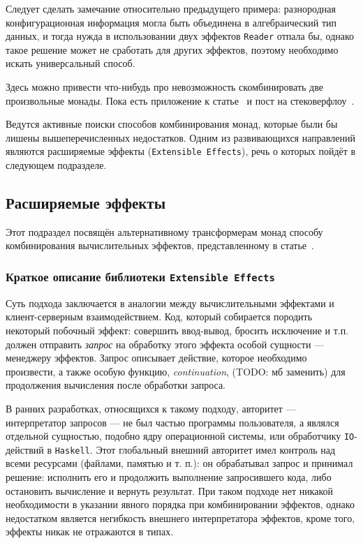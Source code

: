 Следует сделать замечание относительно предыдущего примера: разнородная конфигурационная информация могла быть объединена в алгебраический тип данных, и тогда нужда в использовании двух эффектов \lstinline{Reader} отпала бы, однако такое решение может не сработать для других эффектов, поэтому необходимо искать универсальный способ. 

Здесь можно привести что-нибудь про невозможность скомбинировать две произвольные монады. Пока есть приложение к статье~\autocite{ComposingMonads} и пост на стековерфлоу~\autocite{SOMonadsComposition}.

Ведутся активные поиски способов комбинирования монад, которые были бы лишены вышеперечисленных недостатков. Одним из развивающихся направлений являются расширяемые эффекты (\lstinline{Extensible Effects}), речь о которых пойдёт в следующем подразделе.

\subsection{Расширяемые эффекты}

Этот подраздел посвящён альтернативному трансформерам монад способу комбинирования вычислительных эффектов, представленному в статье~\autocite{ExtEffects}. 

\subsubsection{Краткое описание библиотеки \lstinline{Extensible Effects}}

Суть подхода заключается в аналогии между вычислительными эффектами и клиент-серверным взаимодействием. Код, который собирается породить некоторый побочный эффект: совершить ввод-вывод, бросить исключение и т.п. должен отправить \emph{запрос} на обработку этого эффекта особой сущности --- менеджеру эффектов. Запрос описывает действие, которое необходимо произвести, а также особую функцию, \emph{continuation}, (TODO: мб заменить) для продолжения вычисления после обработки запроса. 

В ранних разработках, относящихся к такому подходу, авторитет --- интерпретатор запросов --- не был частью программы пользователя, а являлся отдельной сущностью, подобно ядру операционной системы, или обработчику \lstinline{IO}-действий в \lstinline{Haskell}. Этот глобальный внешний авторитет имел контроль над всеми ресурсами (файлами, памятью и т. п.): он обрабатывал запрос и принимал решение: исполнить его и продолжить выполнение запросившего кода, либо остановить вычисление и вернуть результат. При таком подходе нет никакой необходимости в указании явного порядка при комбинировании эффектов, однако недостатком является негибкость внешнего интерпретатора эффектов, кроме того, эффекты никак не отражаются в типах.

